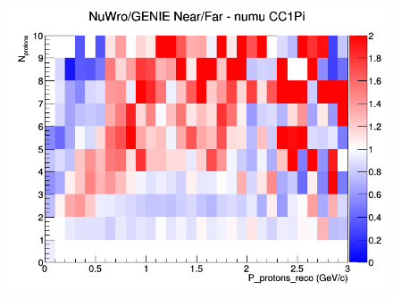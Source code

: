 \documentclass[12pt]{article}
\begin{document}
\begin{figure}[h]
\endminipage
{}
\includegraphics[width=\linewidth]{eff_N_P/GAr/protons/ratios/CC1Pi_NuWro_GENIE_numu_NF_N_P.png}
\endminipage
\newline
\end{figure}
\clearpage
\end{document}
